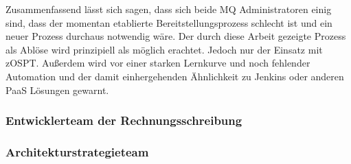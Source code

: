 Zusammenfassend lässt sich sagen, dass sich beide MQ Administratoren einig sind, dass der momentan etablierte Bereitstellungsprozess schlecht ist und ein neuer Prozess durchaus notwendig wäre.
Der durch diese Arbeit gezeigte Prozess als Ablöse wird prinzipiell als möglich erachtet.
Jedoch nur der Einsatz mit zOSPT.
Außerdem wird vor einer starken Lernkurve und noch fehlender Automation und der damit einhergehenden Ähnlichkeit zu Jenkins oder anderen PaaS Lösungen gewarnt.

\subsubsection{Entwicklerteam der Rechnungsschreibung}

\subsubsection{Architekturstrategieteam}

